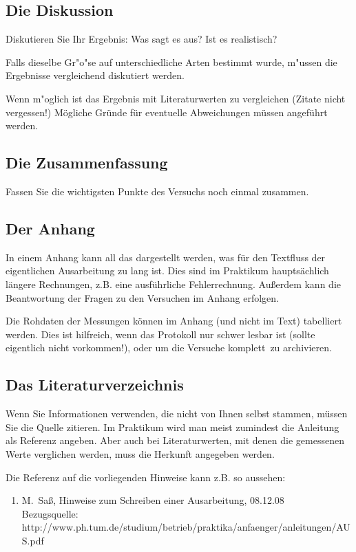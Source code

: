 \documentclass[a4paper,11pt]{article}
\newcommand{\stand}{08.12.08}
\begin{document}
\subsection{Die Diskussion}
   Diskutieren Sie Ihr Ergebnis: Was sagt es aus? Ist es realistisch?

   Falls dieselbe Gr"o"se auf unterschiedliche Arten bestimmt wurde, m"ussen die 
   Ergebnisse vergleichend diskutiert werden.

   Wenn m"oglich ist das Ergebnis mit Literaturwerten zu vergleichen (Zitate nicht vergessen!)
   Mögliche Gründe für eventuelle Abweichungen müssen angeführt werden.
\subsection{Die Zusammenfassung}
   Fassen Sie die wichtigsten Punkte des Versuchs noch einmal zusammen.
   
\subsection{Der Anhang}
   In einem Anhang kann all das dargestellt werden, was für den Textfluss
   der eigentlichen Ausarbeitung zu lang ist. Dies sind im Praktikum
   hauptsächlich längere Rechnungen, z.B. eine ausführliche Fehlerrechnung.
   Außerdem kann die Beantwortung der Fragen zu den Versuchen im 
   Anhang erfolgen. %

   Die Rohdaten der Messungen können im Anhang (und nicht
   im Text) tabelliert werden. Dies ist hilfreich, wenn das Protokoll nur
   schwer lesbar ist (sollte eigentlich nicht vorkommen!), oder um die Versuche
   \glqq komplett\grqq\ zu archivieren. 
\subsection{Das Literaturverzeichnis}
   Wenn Sie Informationen verwenden, die nicht von Ihnen selbst stammen, müssen
   Sie die Quelle zitieren. Im Praktikum wird man meist zumindest die Anleitung als
   Referenz angeben. Aber auch bei Literaturwerten, mit denen die gemessenen Werte
   verglichen werden, muss die Herkunft angegeben werden.
   
   Die Referenz auf die vorliegenden Hinweise kann z.B. so aussehen:
   \begin{enumerate}
   \item M.~Saß, \glqq Hinweise zum Schreiben einer Ausarbeitung\grqq, \stand \\
         Bezugsquelle:\\
         {\small http://www.ph.tum.de/studium/betrieb/praktika/anfaenger/anleitungen/AUS.pdf} 
   \end{enumerate}
\end{document}
